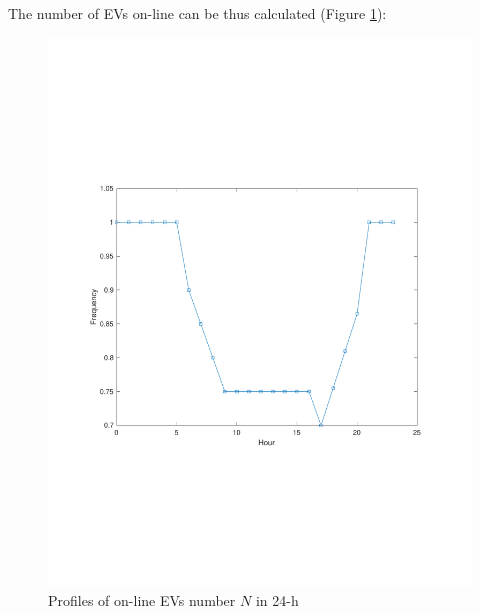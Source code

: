  The number of EVs on-line can be thus calculated (Figure \ref{fig:EV-nb}):
 \begin{figure}[h!]
 	\label{fig:EV-nb}
 	\includegraphics[scale=0.6]{EV_state_nb}
 	\caption{Profiles of on-line EVs number $N$ in 24-h}
 \end{figure}